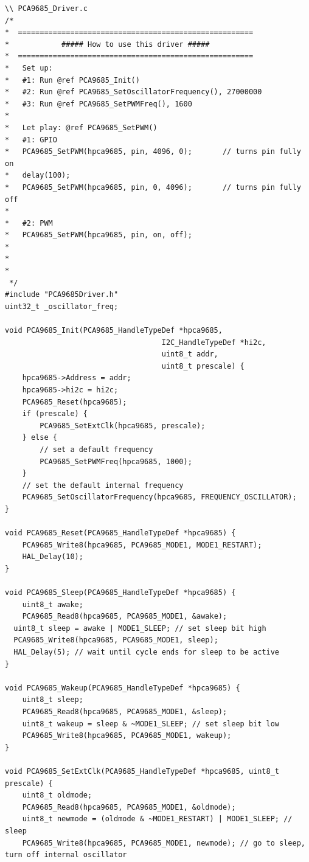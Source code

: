 \begin{lstlisting}
\\ PCA9685_Driver.c
/*
*  ======================================================
*            ##### How to use this driver #####
*  ======================================================
*   Set up:
*   #1: Run @ref PCA9685_Init()
*   #2: Run @ref PCA9685_SetOscillatorFrequency(), 27000000
*   #3: Run @ref PCA9685_SetPWMFreq(), 1600
*
*   Let play: @ref PCA9685_SetPWM()
*   #1: GPIO
*   PCA9685_SetPWM(hpca9685, pin, 4096, 0);       // turns pin fully on
*   delay(100);
*   PCA9685_SetPWM(hpca9685, pin, 0, 4096);       // turns pin fully off
*
*   #2: PWM
*   PCA9685_SetPWM(hpca9685, pin, on, off);
*
*
*
 */
#include "PCA9685Driver.h"
uint32_t _oscillator_freq;

void PCA9685_Init(PCA9685_HandleTypeDef *hpca9685, 
                                    I2C_HandleTypeDef *hi2c,
                                    uint8_t addr,
                                    uint8_t prescale) {
    hpca9685->Address = addr;
    hpca9685->hi2c = hi2c;
    PCA9685_Reset(hpca9685);
    if (prescale) {
        PCA9685_SetExtClk(hpca9685, prescale);
    } else {
        // set a default frequency
        PCA9685_SetPWMFreq(hpca9685, 1000);
    }
    // set the default internal frequency
    PCA9685_SetOscillatorFrequency(hpca9685, FREQUENCY_OSCILLATOR);
}
                                    
void PCA9685_Reset(PCA9685_HandleTypeDef *hpca9685) {
    PCA9685_Write8(hpca9685, PCA9685_MODE1, MODE1_RESTART);
    HAL_Delay(10);
}

void PCA9685_Sleep(PCA9685_HandleTypeDef *hpca9685) {
    uint8_t awake;
    PCA9685_Read8(hpca9685, PCA9685_MODE1, &awake);
  uint8_t sleep = awake | MODE1_SLEEP; // set sleep bit high
  PCA9685_Write8(hpca9685, PCA9685_MODE1, sleep);
  HAL_Delay(5); // wait until cycle ends for sleep to be active
}

void PCA9685_Wakeup(PCA9685_HandleTypeDef *hpca9685) {
    uint8_t sleep;
    PCA9685_Read8(hpca9685, PCA9685_MODE1, &sleep);
    uint8_t wakeup = sleep & ~MODE1_SLEEP; // set sleep bit low
    PCA9685_Write8(hpca9685, PCA9685_MODE1, wakeup);
}

void PCA9685_SetExtClk(PCA9685_HandleTypeDef *hpca9685, uint8_t prescale) {
    uint8_t oldmode;
    PCA9685_Read8(hpca9685, PCA9685_MODE1, &oldmode);
    uint8_t newmode = (oldmode & ~MODE1_RESTART) | MODE1_SLEEP; // sleep
    PCA9685_Write8(hpca9685, PCA9685_MODE1, newmode); // go to sleep, turn off internal oscillator
    

\end{lstlisting}
